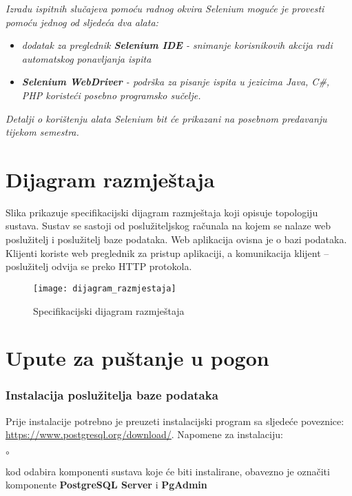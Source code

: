 {			 \textit{Izradu ispitnih slučajeva pomoću radnog okvira Selenium moguće je provesti pomoću jednog od sljedeća dva alata:}
			 \begin{itemize}
			 	\item \textit{dodatak za preglednik \textbf{Selenium IDE} - snimanje korisnikovih akcija radi automatskog ponavljanja ispita	}
			 	\item \textit{\textbf{Selenium WebDriver} - podrška za pisanje ispita u jezicima Java, C\#, PHP koristeći posebno programsko sučelje.}
			 \end{itemize}
		 	\textit{Detalji o korištenju alata Selenium bit će prikazani na posebnom predavanju tijekom semestra.}
			
			\eject 
		
		
		\section{Dijagram razmještaja}
			
			{Slika prikazuje specifikacijski dijagram razmještaja koji opisuje topologiju sustava. Sustav se sastoji od poslužiteljskog računala na kojem se nalaze web poslužitelj i poslužitelj baze podataka. Web aplikacija ovisna je o bazi podataka. Klijenti koriste web preglednik za pristup aplikaciji, a komunikacija klijent – poslužitelj odvija se preko HTTP protokola.}
			 
			 \begin{figure}[H]
			 	
			 	\texttt{[image: dijagram\_razmjestaja]}
			 	\caption{Specifikacijski dijagram razmještaja}
			 	
			 \end{figure}
			
			\eject 
		
		\section{Upute za puštanje u pogon}
		
			\subsubsection{Instalacija poslužitelja baze podataka}
		
			Prije instalacije potrebno je preuzeti instalacijski program sa sljedeće poveznice:
				\href{https://www.postgresql.org/download/}{\underline{https://www.postgresql.org/download/}}.
			\newline\newline
			Napomene za instalaciju:
			\begin{list}{$\circ$}{}
				\item  kod odabira komponenti sustava koje će biti
				instalirane, obavezno je označiti komponente
	 			\textbf{PostgreSQL Server} i \textbf{PgAdmin} 


\end{list}}
